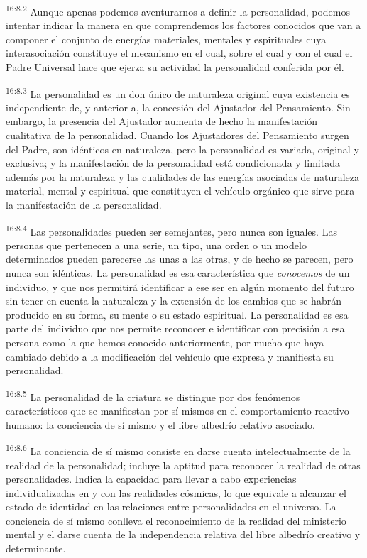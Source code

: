 \par
\textsuperscript{16:8.2} Aunque apenas podemos aventurarnos a definir la personalidad, podemos intentar indicar la manera en que comprendemos los factores conocidos que van a componer el conjunto de energías materiales, mentales y espirituales cuya interasociación constituye el mecanismo en el cual, sobre el cual y con el cual el Padre Universal hace que ejerza su actividad la personalidad conferida por él.

\par
\textsuperscript{16:8.3} La personalidad es un don único de naturaleza original cuya existencia es independiente de, y anterior a, la concesión del Ajustador del Pensamiento. Sin embargo, la presencia del Ajustador aumenta de hecho la manifestación cualitativa de la personalidad. Cuando los Ajustadores del Pensamiento surgen del Padre, son idénticos en naturaleza, pero la personalidad es variada, original y exclusiva; y la manifestación de la personalidad está condicionada y limitada además por la naturaleza y las cualidades de las energías asociadas de naturaleza material, mental y espiritual que constituyen el vehículo orgánico que sirve para la manifestación de la personalidad.

\par
\textsuperscript{16:8.4} Las personalidades pueden ser semejantes, pero nunca son iguales. Las personas que pertenecen a una serie, un tipo, una orden o un modelo determinados pueden parecerse las unas a las otras, y de hecho se parecen, pero nunca son idénticas. La personalidad es esa característica que \textit{conocemos} de un individuo, y que nos permitirá identificar a ese ser en algún momento del futuro sin tener en cuenta la naturaleza y la extensión de los cambios que se habrán producido en su forma, su mente o su estado espiritual. La personalidad es esa parte del individuo que nos permite reconocer e identificar con precisión a esa persona como la que hemos conocido anteriormente, por mucho que haya cambiado debido a la modificación del vehículo que expresa y manifiesta su personalidad.

\par
\textsuperscript{16:8.5} La personalidad de la criatura se distingue por dos fenómenos característicos que se manifiestan por sí mismos en el comportamiento reactivo humano: la conciencia de sí mismo y el libre albedrío relativo asociado.

\par
\textsuperscript{16:8.6} La conciencia de sí mismo consiste en darse cuenta intelectualmente de la realidad de la personalidad; incluye la aptitud para reconocer la realidad de otras personalidades. Indica la capacidad para llevar a cabo experiencias individualizadas en y con las realidades cósmicas, lo que equivale a alcanzar el estado de identidad en las relaciones entre personalidades en el universo. La conciencia de sí mismo conlleva el reconocimiento de la realidad del ministerio mental y el darse cuenta de la independencia relativa del libre albedrío creativo y determinante.

